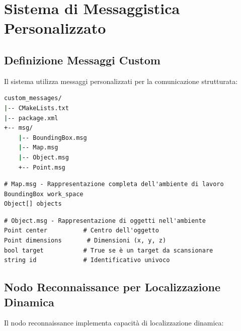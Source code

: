 \documentclass[12pt,a4paper,twoside,openright]{book}
\begin{document}
\section{Sistema di Messaggistica Personalizzato}

\subsection{Definizione Messaggi Custom}

Il sistema utilizza messaggi personalizzati per la comunicazione strutturata:

\begin{lstlisting}[language=bash, caption={Struttura package custom\_messages}]
custom_messages/
|-- CMakeLists.txt
|-- package.xml
+-- msg/
    |-- BoundingBox.msg
    |-- Map.msg
    |-- Object.msg
    +-- Point.msg
\end{lstlisting}

\begin{lstlisting}[caption={Definizione del messaggio Map.msg}]
# Map.msg - Rappresentazione completa dell'ambiente di lavoro
BoundingBox work_space
Object[] objects
\end{lstlisting}

\begin{lstlisting}[caption={Definizione del messaggio Object.msg}]
# Object.msg - Rappresentazione di oggetti nell'ambiente
Point center          # Centro dell'oggetto
Point dimensions       # Dimensioni (x, y, z)
bool target           # True se è un target da scansionare
string id             # Identificativo univoco
\end{lstlisting}

\subsection{Nodo Reconnaissance per Localizzazione Dinamica}

Il nodo reconnaissance implementa capacità di localizzazione dinamica:
\end{document}
